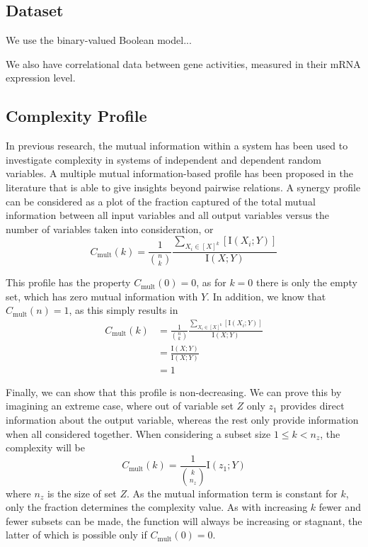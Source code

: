 \documentclass[../main.tex]{subfiles}
\begin{document}
\subsection{Dataset}

We use the binary-valued Boolean model...

We also have correlational data between gene activities, measured in their mRNA expression level.

\subsection{Complexity Profile}

In previous research, the mutual information within a system has been used to investigate complexity in systems of independent and dependent random variables.
A multiple mutual information-based profile has been proposed in the literature that is able to give insights beyond pairwise relations.
A synergy profile can be considered as a plot of the fraction captured of the total mutual information between all input variables and all output variables versus the number of variables taken into consideration, or
%
\begin{equation}
C_\mathrm{mult}(k) = \frac{1}{\binom{n}{k}}\frac{\sum_{X_i \in [X]^k} [\mathrm{I}(X_i;Y)]}{\mathrm{I}(X;Y)}
\end{equation}

This profile has the property $C_\mathrm{mult}(0) = 0$, as for $k = 0$ there is only the empty set, which has zero mutual information with $Y$.
In addition, we know that $C_\mathrm{mult}(n) = 1$, as this simply results in
%
\begin{align}
C_\mathrm{mult}(k) 
&= \frac{1}{\binom{n}{k}}\frac{\sum_{X_i \in [X]^k} [\mathrm{I}(X_i;Y)]}{\mathrm{I}(X;Y)} \\
&= \frac{\mathrm{I}(X;Y)}{\mathrm{I}(X;Y)} \\
&= 1
\end{align}

Finally, we can show that this profile is non-decreasing.
We can prove this by imagining an extreme case, where out of variable set $Z$ only $z_1$ provides direct information about the output variable, whereas the rest only provide information when all considered together.
When considering a subset size $1 \le k < n_z $, the complexity will be
%
\begin{equation}
C_\mathrm{mult}(k) = \frac{1}{\binom{k}{n_z}} \mathrm{I}(z_1;Y)
\end{equation}
%
where $n_z$ is the size of set $Z$.
As the mutual information term is constant for $k$, only the fraction determines the complexity value.
As with increasing $k$ fewer and fewer subsets can be made, the function will always be increasing or stagnant, the latter of which is possible only if $C_\mathrm{mult}(0) = 0$.
\end{document}
